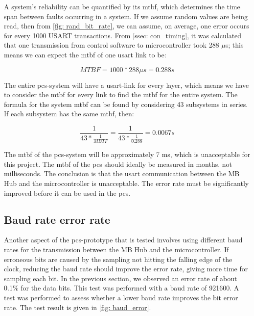 \documentclass[main.tex]{subfiles}
\begin{document}
A system's reliability can be quantified by its \gls{mtbf}, which determines the time span between faults occurring in a system\cite{mtbf_intro}. If we assume random values are being read, then from \autoref{fig: rand_bit_rate}, we can assume, on average, one error occurs for every 1000 USART transactions. From \autoref{ssec: con_timing}, it was calculated that one transmission from control software to microcontroller took 288 $\mu$s; this means we can expect the \gls{mtbf} of one \gls{usart} link to be:

\begin{equation} \label{eqn:single_mtbf}
MTBF = 1000*288\mu s = 0.288 s
\end{equation}

The entire \gls{pcs}-system will have a \gls{usart}-link for every layer, which means we have to consider the \gls{mtbf} for every link to find the \gls{mtbf} for the entire system. The formula for the system \gls{mtbf} can be found by considering 43 subsystems in series\cite{mtbf_calc}. If each subsystem has the same \gls{mtbf}, then:

\begin{equation}
    \frac{1}{43*\frac{1}{MBTF}} = \frac{1}{43*\frac{1}{0.288}} = 0.0067s
\end{equation}

The \gls{mtbf} of the \gls{pcs}-system will be approximately 7 ms, which is unacceptable for this project. The \gls{mtbf} of the \gls{pcs} should ideally be measured in months, not milliseconds. The conclusion is that the \gls{usart} communication between the MB Hub and the microcontroller is unacceptable. The error rate must be significantly improved before it can be used in the \gls{pcs}.



\subsection{Baud rate error rate}
\label{ssec:baud_error}
Another aspect of the \gls{pcs}-prototype that is tested involves using different baud rates for the transmission between the MB Hub and the microcontroller. If erroneous bits are caused by the sampling not hitting the falling edge of the clock, reducing the baud rate should improve the error rate, giving more time for sampling each bit. In the previous section, we observed an error rate of about 0.1\% for the data bits. This test was performed with a baud rate of 921600. A test was performed to assess whether a lower baud rate improves the bit error rate. The test result is given in \autoref{fig: baud_error}.
\end{document}
